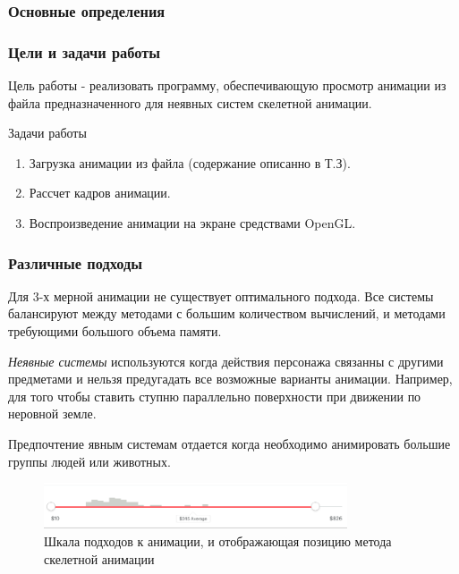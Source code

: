 \documentclass{beamer}
\begin{document}
\begin{frame}
\frametitle{Основные определения}
    
\end{frame}


\begin{frame}
\frametitle{Цели и задачи работы}
    Цель работы - реализовать программу, обеспечивающую просмотр анимации из файла предназначенного для неявных систем скелетной анимации.
    
    \bigskip
    
    Задачи работы
    
    \smallskip
	\begin{enumerate}
	\item Загрузка анимации из файла (содержание описанно в Т.З).
	\item Рассчет кадров анимации.
	\item Воспроизведение анимации на экране средствами OpenGL.
	\end{enumerate}
    
\end{frame}



\begin{frame}
\frametitle{Различные подходы}
\begin{small}
    Для 3-х мерной анимации не существует оптимального подхода. Все системы балансируют между методами с большим количеством вычислений, и методами требующими большого объема памяти.
    
    \medskip
    \emph{Неявные системы} используются когда действия персонажа связанны с другими предметами и нельзя предугадать все возможные варианты анимации. Например, для того чтобы ставить ступню параллельно поверхности при движении по неровной земле.
    
    \smallskip
    Предпочтение явным системам отдается когда необходимо анимировать большие группы людей или животных.
    
\begin{figure}[h!]
    \centering
    \includegraphics[width=0.8\textwidth]{raw_graph_cpu_vs_ram.png}
    \caption{Шкала подходов к анимации, и отображающая позицию метода скелетной анимации}
\end{figure}

\end{small}
\end{frame}
\end{document}
